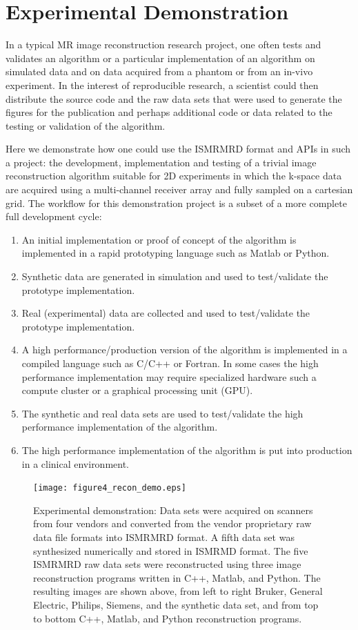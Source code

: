 \documentclass[12pt]{article}
\begin{document}
\section*{Experimental Demonstration}
In a typical MR image reconstruction research project, one often tests and validates an algorithm or a particular implementation of an algorithm on simulated data and on data acquired from a phantom or from an in-vivo experiment.  In the interest of reproducible research, a scientist could then distribute the source code and the raw data sets that were used to generate the figures for the publication and perhaps additional code or data related to the testing or validation of the algorithm.

Here we demonstrate how one could use the ISMRMRD format and APIs in such a project: the development, implementation and testing of a trivial image reconstruction algorithm suitable for 2D experiments in which the k-space data are acquired using a multi-channel receiver array and fully sampled on a cartesian grid.  The workflow for this demonstration project is a subset of a more complete full development cycle:
\begin{enumerate}
\item An initial implementation or proof of concept of the algorithm is implemented in a rapid prototyping language such as Matlab or Python.
\item Synthetic data are generated in simulation and used to test/validate the prototype implementation.
\item Real (experimental) data are collected and used to test/validate the prototype implementation.
\item A high performance/production version of the algorithm is implemented in a compiled language such as C/C++ or Fortran.  In some cases the high performance implementation may require specialized hardware such a compute cluster or a graphical processing unit (GPU).
\item The synthetic and real data sets are used to test/validate the high performance implementation of the algorithm.
\item The high performance implementation of the algorithm is put into production in a clinical environment.
\end{enumerate}

\begin{figure}
\begin{center}
\texttt{[image: figure4\_recon\_demo.eps]}
\end{center}
\caption{Experimental demonstration:  Data sets were acquired on scanners from four vendors and converted from the vendor proprietary raw data file formats into ISMRMRD format.  A fifth data set was synthesized numerically and stored in ISMRMD format.  The five ISMRMRD raw data sets were reconstructed using three image reconstruction programs written in C++, Matlab, and Python.  The resulting images are shown above, from left to right Bruker, General Electric, Philips, Siemens, and the synthetic data set,  and from top to bottom C++, Matlab, and Python reconstruction programs.}
\label{fig:demo}
\end{figure}
\end{document}
